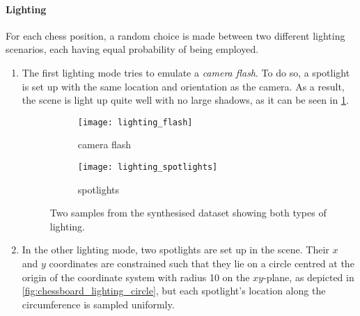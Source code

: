 \documentclass[../main.tex]{subfiles}
\begin{document}
\paragraph{Lighting}
For each chess position, a random choice is made between two different lighting scenarios, each having equal probability of being employed.
\begin{enumerate}
    \item The first lighting mode tries to emulate a \emph{camera flash}.
        To do so, a spotlight is set up with the same location and orientation as the camera. 
        As a result, the scene is light up quite well with no large shadows, as it can be seen in \cref{fig:lighting_flash_example}.
        \begin{figure}
            \centering
            \begin{subfigure}[b]{0.47\textwidth}
                \centering
                \texttt{[image: lighting\_flash]}
                \caption{camera flash}
                \label{fig:lighting_flash_example}
            \end{subfigure}
            \hfill
            \begin{subfigure}[b]{0.47\textwidth}
                \centering
                \texttt{[image: lighting\_spotlights]}
                \caption{spotlights}
                \label{fig:lighting_spotlights_example}
            \end{subfigure}
            \caption{Two samples from the synthesised dataset showing both types of lighting.}
            \label{fig:lighting_examples}
        \end{figure}
    \item In the other lighting mode, two spotlights are set up in the scene. 
        Their $x$ and $y$ coordinates are constrained such that they lie on a circle centred at the origin of the coordinate system with radius 10 on the $xy$-plane, as depicted in \cref{fig:chessboard_lighting_circle}, but each spotlight's location along the circumference is sampled uniformly.
        \begin{figure}
            \centering
\end{figure}
\end{enumerate}
\end{document}

